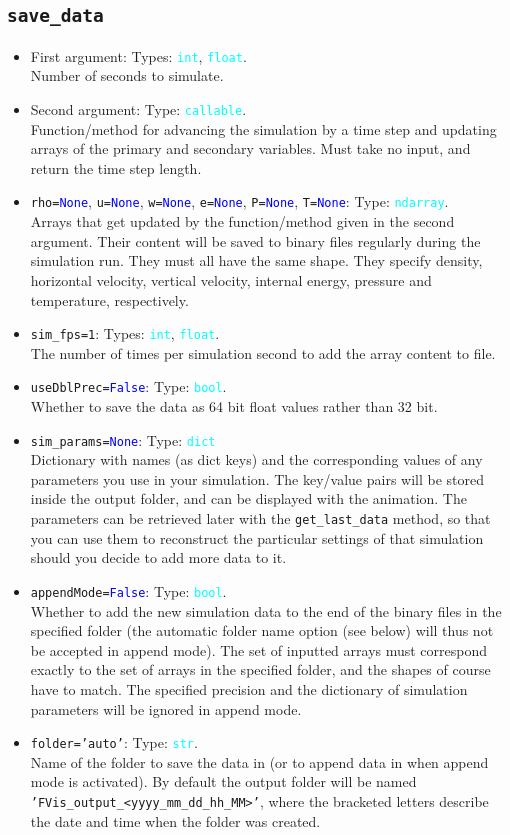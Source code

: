 \documentclass{article}
\newcommand{\ttt}[1]{\texttt{#1}}
\newcommand{\ptype}[1]{\texttt{\textcolor{cyan}{#1}}}
\newcommand{\cbl}[1]{\textcolor{blue}{#1}}
\newcommand{\cro}[1]{\textcolor{RedOrange}{#1}}
\newcommand{\cyo}[1]{\textcolor{YellowOrange}{#1}}
\begin{document}
\subsection{\ttt{save\_data}}
\label{sec:sd}
\begin{itemize}
	\item First argument: Types: \ptype{int}, \ptype{float}.\\Number of seconds to simulate.
	\item Second argument: Type: \ptype{callable}.\\Function/method for advancing the simulation by a time step and updating arrays of the primary and secondary variables. Must take no input, and return the time step length.
	\item \ttt{\cro{rho}=\cbl{None}}, \ttt{\cro{u}=\cbl{None}}, \ttt{\cro{w}=\cbl{None}}, \ttt{\cro{e}=\cbl{None}}, \ttt{\cro{P}=\cbl{None}}, \ttt{\cro{T}=\cbl{None}}: Type: \ptype{ndarray}.\\Arrays that get updated by the function/method given in the second argument. Their content will be saved to binary files regularly during the simulation run. They must all have the same shape. They specify density, horizontal velocity, vertical velocity, internal energy, pressure and temperature, respectively.
	\item \ttt{\cro{sim\_fps}=1}: Types: \ptype{int}, \ptype{float}.\\The number of times per simulation second to add the array content to file.
	\item \ttt{\cro{useDblPrec}=\cbl{False}}: Type: \ptype{bool}.\\Whether to save the data as 64 bit float values rather than 32 bit.
	\item \ttt{\cro{sim\_params}=\cbl{None}}: Type: \ptype{dict}\\Dictionary with names (as dict keys) and the corresponding values of any parameters you use in your simulation. The key/value pairs will be stored inside the output folder, and can be displayed with the animation. The parameters can be retrieved later with the \ttt{get\_last\_data} method, so that you can use them to reconstruct the particular settings of that simulation should you decide to add more data to it.
	\item\ttt{\cro{appendMode}=\cbl{False}}: Type: \ptype{bool}.\\Whether to add the new simulation data to the end of the binary files in the specified folder (the automatic folder name option (see below) will thus not be accepted in append mode). The set of inputted arrays must correspond exactly to the set of arrays in the specified folder, and the shapes of course have to match. The specified precision and the dictionary of simulation parameters will be ignored in append mode.
	\item \ttt{\cro{folder}=\cyo{'auto'}}: Type: \ptype{str}.\\Name of the folder to save the data in (or to append data in when append mode is activated). By default the output folder will be named \ttt{'FVis\_output\_<yyyy\_mm\_dd\_hh\_MM>'}, where the bracketed letters describe the date and time when the folder was created.
\end{itemize}
\end{document}
